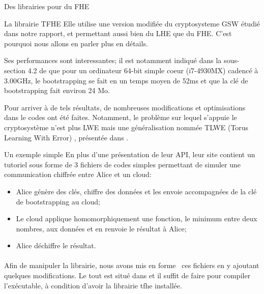 \begin{section}{Des librairies pour du FHE}
\begin{subsection}{La librairie TFHE}
Elle utilise une version modifiée du cryptosysteme GSW \cite{C:GenSahWat13}
étudié dans notre rapport, et permettant aussi bien du LHE que du FHE. C'est
pourquoi nous allons en parler plus en détails.

Ses performances sont interessantes; il est notamment indiqué dans la sous-section
4.2 de \cite{cryptoeprint:2016:870} que pour un ordinateur 64-bit simple coeur 
(i7-4930MX) cadencé à 3.00GHz, le bootstrapping se fait en un temps moyen de 52ms et 
que la clé de bootstrapping fait environ 24 Mo.

Pour arriver à de tels résultats, de nombreuses modifications et optimisations dans le codes ont été faites. Notamment,
le problème sur lequel s'appuie le cryptosystème n'est plus LWE mais une généralisation nommée TLWE (Torus Learning With
Error) , présentée dans
\cite{cryptoeprint:2016:870}. 

\begin{subsubsection}{Un exemple simple}
En plus d'une présentation de leur API, leur site contient un tutoriel sous forme de 3 fichiers de codes simples
permettant de simuler une communication chiffrée entre Alice et un cloud:
\begin{itemize}
\item Alice génère des clés, chiffre des données et les envoie accompagnées de la clé de bootstrapping au cloud;
\item Le cloud applique homomorphiquement une fonction, le minimum entre deux nombres, aux données et en renvoie le résultat à Alice;
\item Alice déchiffre le résultat.
\end{itemize}

\paragraph{}
Afin de manipuler la librairie, nous avons \og mis en forme \fg \ ces fichiers
en y ajoutant quelques modifications. Le tout est situé dans 
 et il suffit de faire  
pour compiler l'exécutable, à condition d'avoir la librairie tfhe installée.
	

\end{subsubsection}
\end{subsection}
\end{section}
